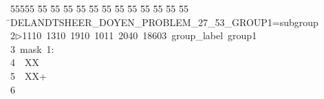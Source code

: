 %
%
\begin{tabbing}
55555 \= 55 \= 55 \= 55 \= 55 \= 55 \= 55 \= 55 \= 55 \= 55 \= 55 \= 55 \= 55 \= \>DELANDTSHEER\_DOYEN\_PROBLEM\_27\_53\_GROUP1=subgroup\ \\[0pt]
2\>$\triangleright$\>1110\ 1310\ 1910\ 1011\ 2040\ 18603\ group\_label\ group1\\[0pt]
3\>\ mask\ 1:\\[0pt]
4\>\ \ XX\\[0pt]
5\>\ \ XX+\\[0pt]
6\>\end{tabbing}
